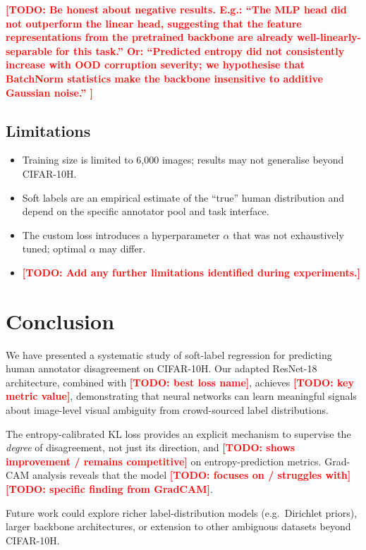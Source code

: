 \documentclass[11pt,a4paper]{article}
\newcommand{\todo}[1]{\textcolor{red}{\textbf{[TODO: #1]}}}
\begin{document}
\todo{%
  Be honest about negative results.
  E.g.: ``The MLP head did not outperform the linear head, suggesting that the
  feature representations from the pretrained backbone are already
  well-linearly-separable for this task.''
  Or: ``Predicted entropy did not consistently increase with OOD corruption
  severity; we hypothesise that BatchNorm statistics make the backbone
  insensitive to additive Gaussian noise.''
}

\subsection{Limitations}

\begin{itemize}[noitemsep]
  \item Training size is limited to 6,000 images; results may not generalise
        beyond CIFAR-10H.
  \item Soft labels are an empirical estimate of the ``true'' human distribution
        and depend on the specific annotator pool and task interface.
  \item The custom loss introduces a hyperparameter $\alpha$ that was not
        exhaustively tuned; optimal $\alpha$ may differ.
  \item \todo{Add any further limitations identified during experiments.}
\end{itemize}

\section{Conclusion}

We have presented a systematic study of soft-label regression for predicting
human annotator disagreement on CIFAR-10H.
Our adapted ResNet-18 architecture, combined with \todo{best loss name},
achieves \todo{key metric value}, demonstrating that neural networks can learn
meaningful signals about image-level visual ambiguity from crowd-sourced label
distributions.

The entropy-calibrated KL loss provides an explicit mechanism to supervise the
\emph{degree} of disagreement, not just its direction, and \todo{shows
improvement / remains competitive} on entropy-prediction metrics.
Grad-CAM analysis reveals that the model \todo{focuses on / struggles with}
\todo{specific finding from GradCAM}.

Future work could explore richer label-distribution models (e.g.\ Dirichlet
priors), larger backbone architectures, or extension to other ambiguous
datasets beyond CIFAR-10H.
\end{document}
